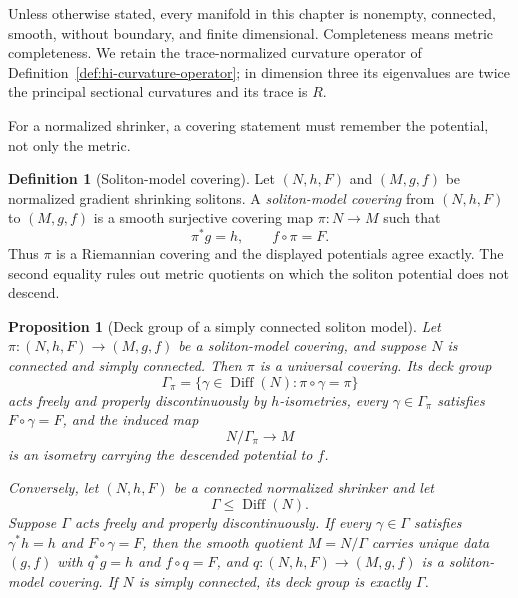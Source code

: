 \documentclass[10pt]{coll-l}
\newtheorem{proposition}[theorem]{Proposition}
\theoremstyle{definition}
\newtheorem{definition}[theorem]{Definition}
\theoremstyle{remark}
\numberwithin{section}{chapter}
\numberwithin{equation}{chapter}
\begin{document}
Unless otherwise stated, every manifold in this chapter is nonempty,
connected, smooth, without boundary, and finite dimensional.  Completeness
means metric completeness.  We retain the trace-normalized curvature
operator of Definition~\ref{def:hi-curvature-operator}; in dimension three
its eigenvalues are twice the principal sectional curvatures and its trace
is $R$.

For a normalized shrinker, a covering statement must remember the
potential, not only the metric.

\begin{definition}[Soliton-model covering]
\label{def:soliton-model-covering}
Let $(N,h,F)$ and $(M,g,f)$ be normalized gradient shrinking solitons.  A
\emph{soliton-model covering} from $(N,h,F)$ to $(M,g,f)$ is a smooth
surjective covering map $\pi:N\to M$ such that
\begin{equation}
                       \pi^*g=h,
             \qquad   f\circ\pi=F.                       \label{eq:soliton-model-covering}
\end{equation}
Thus $\pi$ is a Riemannian covering and the displayed potentials agree
exactly.  The second equality rules out metric quotients on which the
soliton potential does not descend.
\end{definition}

\begin{proposition}[Deck group of a simply connected soliton model]
\label{prop:soliton-model-covering-deck-group}
Let $\pi:(N,h,F)\to(M,g,f)$ be a soliton-model covering, and suppose $N$
is connected and simply connected.  Then $\pi$ is a universal covering.
Its deck group
\begin{equation}
        \Gamma_\pi=
        \{\gamma\in\operatorname{Diff}(N):\pi\circ\gamma=\pi\}             \label{eq:soliton-model-deck-group}
\end{equation}
acts freely and properly discontinuously by $h$-isometries, every
$\gamma\in\Gamma_\pi$ satisfies $F\circ\gamma=F$, and the induced map
\begin{equation}
                 N/\Gamma_\pi\longrightarrow M           \label{eq:soliton-model-quotient-identification}
\end{equation}
is an isometry carrying the descended potential to $f$.

Conversely, let $(N,h,F)$ be a connected normalized shrinker and let
\[
                       \Gamma\leq\operatorname{Diff}(N).
\]
Suppose $\Gamma$ acts freely and properly discontinuously.
If every $\gamma\in\Gamma$ satisfies $\gamma^*h=h$ and
$F\circ\gamma=F$, then the smooth quotient $M=N/\Gamma$ carries unique
data $(g,f)$ with $q^*g=h$ and $f\circ q=F$, and
$q:(N,h,F)\to(M,g,f)$ is a soliton-model covering.  If $N$ is simply
connected, its deck group is exactly $\Gamma$.
\end{proposition}
\end{document}
